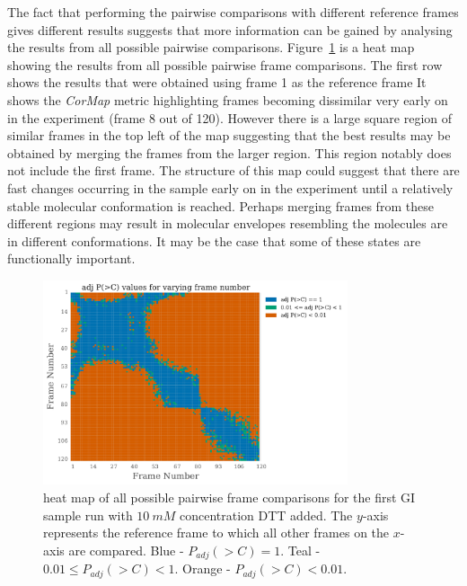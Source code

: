 The fact that performing the pairwise comparisons with different reference frames gives different results suggests that more information can be gained by analysing the results from all possible pairwise comparisons.
Figure~\ref{fig:heatmap - DTT} is a heat map showing the results from all possible pairwise frame comparisons.
The first row shows the results that were obtained using frame 1 as the reference frame
It shows the \textit{CorMap} metric highlighting frames becoming dissimilar very early on in the experiment (frame 8 out of 120).
However there is a large square region of similar frames in the top left of the map suggesting that the best results may be obtained by merging the frames from the larger region.
This region notably does not include the first frame.
The structure of this map could suggest that there are fast changes occurring in the sample early on in the experiment until a relatively stable molecular conformation is reached.
Perhaps merging frames from these different regions may result in molecular envelopes resembling the molecules are in different conformations.
It may be the case that some of these states are functionally important.
\begin{figure}
    \centering
    \includegraphics[width=0.8\textwidth]{figures/saxs/dtt_heatmap.pdf}
    \caption{heat map of all possible pairwise frame comparisons for the first GI sample run with $10\ mM$ concentration DTT added. The $y$-axis represents the reference frame to which all other frames on the $x$-axis are compared. Blue - $P_{adj}(>C) = 1$. Teal - $0.01 \le P_{adj}(>C) < 1 $. Orange - $P_{adj}(>C) < 0.01$.}
    \label{fig:heatmap - DTT}
\end{figure}


